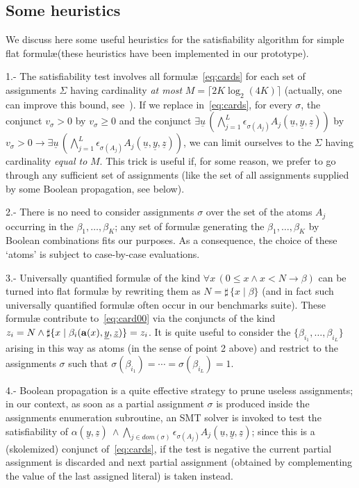 \documentclass[11pt,a4paper]{article}
\newcommand{\formulae}{formul\ae\xspace}
\newcommand{\uu}{\ensuremath{\underline u}}
\newcommand{\uy}{\ensuremath{\underline y}}
\newcommand{\uz}{\ensuremath{\underline z}}
\newcommand{\ta}{\ensuremath{{\bf a}}\xspace}
\begin{document}
{\subsection{ Some heuristics}\label{subsec:heuristics}
We discuss here some useful heuristics for  the satisfiability algorithm for simple flat \formulae (these heuristics have been implemented in our prototype).


1.- The satisfiability test involves all \formulae~\eqref{eq:cards} for each set of assignments $\Sigma$ having cardinality \emph{at most}   $M= \lceil 2K \log_2(4K)\rceil$ 
(actually, one can improve this bound, see~\cite{cade21}). If we replace in~\eqref{eq:cards}, for every $\sigma$, the conjunct 
$v_{\sigma} >0$ by $v_{\sigma} \geq 0$ and the conjunct
$\exists \uu\, (\bigwedge_{j=1}^L \epsilon_{\sigma(A_j)} A_j(\uu, \uy, \uz))$
by
$v_{\sigma}> 0 \to\exists \uu \,(\bigwedge_{j=1}^L \epsilon_{\sigma(A_j)} A_j(\uu, \uy, \uz))$, 
we can limit ourselves to the $\Sigma$ having cardinality \emph{equal to} $M$. This trick is useful if, for some reason, we prefer to go through any sufficient set of assignments (like  the set of all assignments supplied by some Boolean propagation, see below).

2.- There is no need to consider assignments $\sigma$ over the set of the atoms $A_j$ occurring in the $\beta_1,\dots, \beta_K$; any set of \formulae generating the $\beta_1, \dots, \beta_K$ by 
Boolean combinations fits our purposes. As a consequence, the choice of these
`atoms' is subject to case-by-case evaluations.

3.- Universally quantified \formulae of the kind $\forall x\,(0\leq x \wedge x< N \to \beta)$ can be turned into flat \formulae by rewriting them as
$N =\sharp\,\{ x\mid \beta\}$ (and in fact such universally quantified \formulae often occur in our benchmarks suite).
 These \formulae contribute to~\eqref{eq:card00} via the conjuncts of the kind
$z_i=N \wedge \sharp\{ x\mid \beta_i(\ta(x), \uy, \uz)\} = z_i$. It is quite useful to
consider the $\{\beta_{i_1}, \dots, \beta_{i_L}\}$ arising in this way as atoms (in the sense of point 2 above) and restrict to the assignments $\sigma$ 
such that $\sigma(\beta_{i_1})= \cdots = \sigma(\beta_{i_L})=1$. 

4.- Boolean propagation is a quite effective strategy to prune useless assignments; in our context, as soon as a partial assignment $\sigma$ is produced inside the assignments enumeration subroutine, 
an SMT solver is invoked to test the satisfiability of 
$\alpha(\uy, \uz)~ \wedge  \bigwedge_{j\in dom(\sigma)} \epsilon_{\sigma(A_j)} A_j(\uu, \uy, \uz)$; since this is a (skolemized) conjunct of~\eqref{eq:cards}, if 
the test is negative the current partial assignment is discarded and next partial assignment (obtained by complementing the value of the last assigned literal) is taken instead.


}
\end{document}
